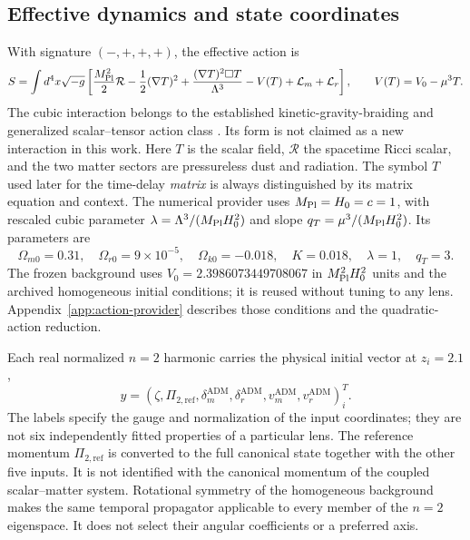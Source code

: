 \documentclass[11pt,a4paper]{article}
\begin{document}
\subsection{Effective dynamics and state coordinates}

With signature $(-,+,+,+)$, the effective action is
\begin{equation}
 S=\int d^4x\sqrt{-g}\left[
 \frac{M_{\rm Pl}^2}{2}\mathcal R
 -\frac12(\nabla T)^2
 +\frac{(\nabla T)^2\Box T}{\Lambda^3}
 -V(T)+\mathcal L_m+\mathcal L_r\right],
 \qquad V(T)=V_0-\mu^3T.
 \label{eq:effective-action}
\end{equation}
The cubic interaction belongs to the established kinetic-gravity-braiding
and generalized scalar--tensor action class
\cite{Deffayet2010Braiding,Kobayashi2011Generalized}.
Its form is not claimed as a new interaction in this work.
Here $T$ is the scalar field, $\mathcal R$ the spacetime Ricci scalar,
and the two matter sectors are pressureless dust and radiation.
The symbol $T$ used later for the time-delay \emph{matrix} is always
distinguished by its matrix equation and context. The numerical provider
uses $M_{\rm Pl}=H_0=c=1$, with rescaled cubic parameter
$\lambda=\Lambda^3/(M_{\rm Pl}H_0^2)$ and slope
$q_T=\mu^3/(M_{\rm Pl}H_0^2)$. Its parameters are
\begin{equation}
 \Omega_{m0}=0.31,\quad\Omega_{r0}=9\times10^{-5},\quad
 \Omega_{k0}=-0.018,\quad K=0.018,\quad
 \lambda=1,\quad q_T=3.
 \label{eq:background-values}
\end{equation}
The frozen background uses $V_0=2.3986073449708067$ in
$M_{\rm Pl}^2H_0^2$ units and the archived
homogeneous initial conditions; it is reused without tuning to any lens.
Appendix~\ref{app:action-provider} describes those conditions and the
quadratic-action reduction.

Each real normalized $n=2$ harmonic carries the physical initial vector
at $z_i=2.1$,
\begin{equation}
 y=\left(\zeta,\Pi_{2,\mathrm{ref}},
 \delta_m^{\mathrm{ADM}},\delta_r^{\mathrm{ADM}},
 v_m^{\mathrm{ADM}},v_r^{\mathrm{ADM}}\right)_i^T.
 \label{eq:physical-anchor}
\end{equation}
The labels specify the gauge and normalization of the input coordinates;
they are not six independently fitted properties of a particular lens.
The reference momentum $\Pi_{2,\mathrm{ref}}$ is converted to the full
canonical state together with the other five inputs. It is not identified
with the canonical momentum of the coupled scalar--matter system.
Rotational symmetry of the homogeneous background makes the same
temporal propagator applicable to every member of the $n=2$ eigenspace.
It does not select their angular coefficients or a preferred axis.
\end{document}

